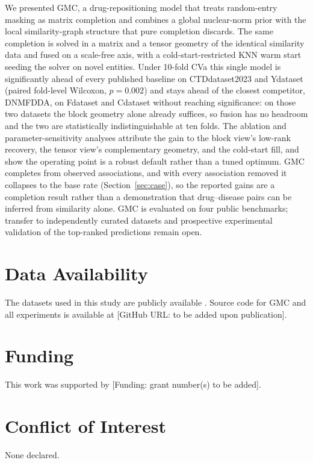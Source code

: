 \documentclass[webpdf,modern,large]{oup-authoring-template}
\begin{document}
We presented GMC, a drug-repositioning model that treats random-entry masking as matrix completion and combines a global nuclear-norm prior with the local similarity-graph structure that pure completion discards. The same completion is solved in a matrix and a tensor geometry of the identical similarity data and fused on a scale-free axis, with a cold-start-restricted KNN warm start seeding the solver on novel entities. Under 10-fold CVa this single model is significantly ahead of every published baseline on CTDdataset2023 and Ydataset (paired fold-level Wilcoxon, $p=0.002$) and stays ahead of the closest competitor, DNMFDDA, on Fdataset and Cdataset without reaching significance: on those two datasets the block geometry alone already suffices, so fusion has no headroom and the two are statistically indistinguishable at ten folds. The ablation and parameter-sensitivity analyses attribute the gain to the block view's low-rank recovery, the tensor view's complementary geometry, and the cold-start fill, and show the operating point is a robust default rather than a tuned optimum. GMC completes from observed associations, and with every association removed it collapses to the base rate (Section~\ref{sec:case}), so the reported gains are a completion result rather than a demonstration that drug--disease pairs can be inferred from similarity alone. GMC is evaluated on four public benchmarks; transfer to independently curated datasets and prospective experimental validation of the top-ranked predictions remain open.

\section*{Data Availability}

The datasets used in this study are publicly available \citep{yang2020msbmf}. Source code for GMC and all experiments is available at [GitHub URL: to be added upon publication].

\section*{Funding}

This work was supported by [Funding: grant number(s) to be added].

\section*{Conflict of Interest}

None declared.
\end{document}
